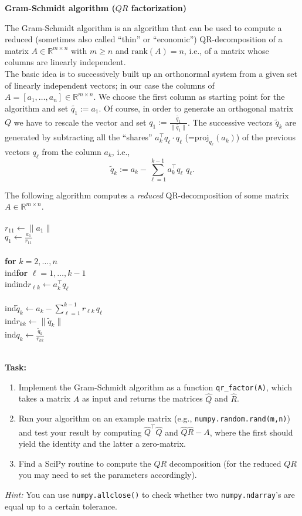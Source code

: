 \textbf{Gram-Schmidt algorithm ($QR$ factorization)}

{\color{navy}
The Gram-Schmidt algorithm is an algorithm that can be used to compute a reduced (sometimes also called ``thin'' or ``economic'') QR-decomposition of a matrix $A \in \mathbb{R}^{m\times n}$ with $m\geq n$ and $\text{rank}(A) = n$, i.e., of a matrix whose columns are linearly independent.\\
The basic idea is to successively 
built up an orthonormal system from a given set of linearly independent vectors; in our case the columns of 
$A = [a_1, \dots, a_n] \in \mathbb{R}^{m\times n}$.
We choose the first column as starting point for the algorithm and set $\widetilde{q_1} := a_1$. 
Of course, in order to generate an orthogonal matrix $Q$ we have to rescale the vector and set
$q_1 := \frac{\widetilde{q_1}}{\| \widetilde{q_1} \|}$.
The successive vectors $\widetilde{q}_k$ are generated by
subtracting all the ``shares'' $a_k^\top q_\ell\cdot q_\ell$ (=$\text{proj}_{q_\ell}(a_k)$) of the previous vectors $q_\ell$ from the column $a_k$, i.e.,
$$
\widetilde{q}_k := a_k - \sum_{\ell = 1}^{k-1} a_k^\top q_\ell \,\, q_\ell.
$$


The following algorithm computes a \textit{reduced} QR-decomposition of some matrix $A \in \mathbb{R}^{m \times n}$.\\
~\\
$r_{11} \gets \| a_1 \|$\\
$q_1 \gets \frac{a_1}{r_{11}}$\\
~\\
\textbf{for} $k = 2, \dots, n$  \\
{\color{white}ind}\textbf{for} $\ell = 1,\dots, k-1$ \\
{\color{white}ind}{\color{white}ind}$r_{\ell k} \gets a_k^\top q_\ell$	\\
~\\
{\color{white}ind}$\widetilde{q}_k \gets a_k - \sum _{\ell=1}^{k-1} r_{\ell k} \, q_\ell$\\
{\color{white}ind}$r_{kk} \gets \| \widetilde{q}_k \|$\\
{\color{white}ind}$q_k \gets \frac{\widetilde{q}_k}{r_{kk}}$\\
}
~\\
\textbf{Task:} 
\begin{enumerate}
	\item Implement the Gram-Schmidt algorithm as a function \verb|qr_factor(A)|, which takes a matrix $A$ as input and returns the matrices $\widehat{Q}$ and $\widehat{R}$.
	\item Run your algorithm on an example matrix (e.g., \texttt{numpy.random.rand(m,n)}) and test your result by computing $\widehat{Q}^\top \widehat{Q}$ and $\widehat{Q}\widehat{R} - A$, where the first should yield the identity and the latter a zero-matrix.
	\item Find a SciPy routine to compute the $QR$ decomposition (for the reduced $QR$ you may need to set the parameters accordingly).
\end{enumerate}

\textit{Hint: } You can use \texttt{numpy.allclose()} to check whether two \texttt{numpy.ndarray}'s are equal up to a certain tolerance.
